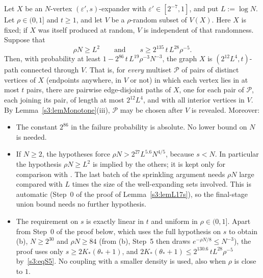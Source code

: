 \begin{theorem}\label{s3:thmT16s}
Let $X$ be an $N$-vertex $(\varepsilon',s)$-expander with
$\varepsilon'\in[2^{-7},1]$, and put $L:=\log N$. Let $\rho\in(0,1]$ and
$t\ge1$, and let $V$ be a $\rho$-random subset of $V(X)$. Here $X$ is
fixed; if $X$ was itself produced at random, $V$ is independent of that
randomness. Suppose that
\[
\rho N\ge L^2\qquad\text{and}\qquad s\ge 2^{135}\,t\,L^{28}\rho^{-5}.
\]
Then, with probability at least $1-2^{86}\,t\,L^{19}\rho^{-3}N^{-3}$, the
graph $X$ is $(2^{12}L^4,t)$-path connected through $V$. That is, for
\emph{every} multiset $\mathcal P$ of pairs of distinct vertices of $X$
(endpoints anywhere, in $V$ or not) in which each vertex lies in at most
$t$ pairs, there are pairwise edge-disjoint paths of $X$, one for each
pair of $\mathcal P$, each joining its pair, of length at most
$2^{12}L^4$, and with all interior vertices in $V$. By
Lemma~\ref{s3:lemMonotone}(iii), $\mathcal P$ may be chosen after $V$ is
revealed. Moreover:
\begin{itemize}
\item[(a)] The constant $2^{86}$ in the failure probability is absolute.
  No lower bound on $N$ is needed.
\item[(b)] If $N\ge2$, the hypotheses force
  $\rho N>2^{27}L^{5.6}N^{4/5}$, because $s<N$. In particular the
  hypothesis $\rho N\ge L^2$ is implied by the others; it is kept only
  for comparison with \cite[Theorem~16]{BM}. The last batch of the
  sprinkling argument needs $\rho N$ large compared with $L$ times the
  size of the well-expanding sets involved. This is automatic (Step~0 of
  the proof of Lemma~\ref{s3:lemL17s}), so the final-stage union bound
  needs no further hypothesis.
\item[(c)] The requirement on $s$ is exactly linear in $t$ and uniform in
  $\rho\in(0,1]$. Apart from Step~0 of the proof below, which uses the full hypothesis on $s$ to
  obtain (b), $N\ge2^{30}$ and $\rho N\ge84$ (from (b), Step~5 then draws
  $e^{-\rho N/8}\le N^{-3}$),
  the proof uses only $s\ge2K_*(\theta_*+1)$, and
  $2K_*(\theta_*+1)\le2^{130.6}\,tL^{28}\rho^{-5}$ by~\ref{s3:eqS5}. No
  coupling with a smaller density is used, also when $\rho$ is close to
  $1$.
\end{itemize}
\deps{\ref{s3:lemL15p}, \ref{s3:propP13s}, \ref{s3:lemL17s}, \ref{s3:lemP18s}, \ref{s3:lemL9rho}, \ref{s3:lemMonotone}, \ref{s1:citDef11}, \ref{s1:citChernoff}}
\end{theorem}

